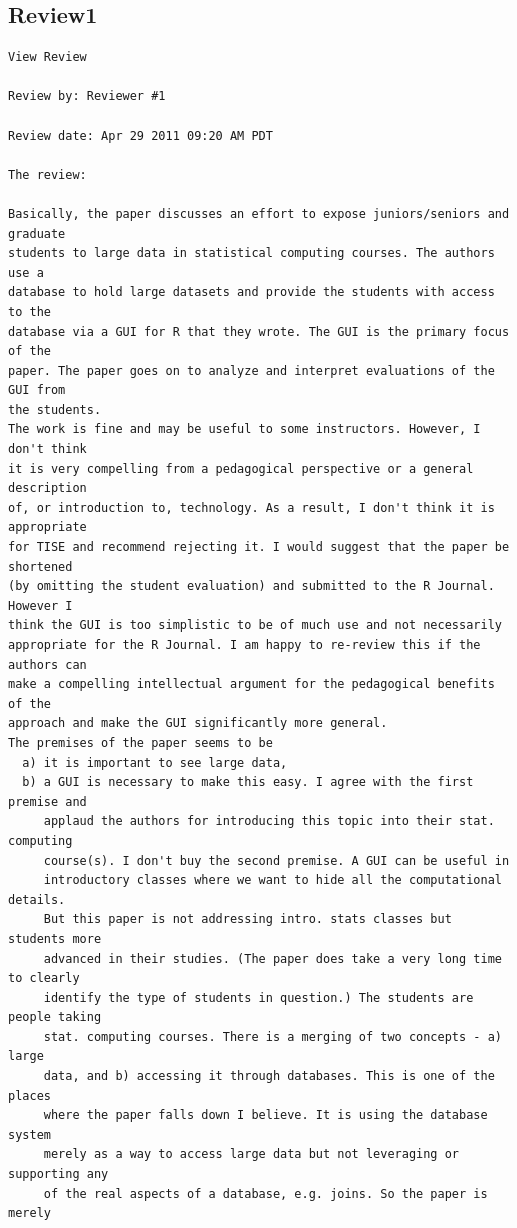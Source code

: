\documentclass[11pt]{tise_style}
\begin{document}
\subsection{Review1}

\begin{verbatim}
View Review

Review by: Reviewer #1

Review date: Apr 29 2011 09:20 AM PDT

The review:

Basically, the paper discusses an effort to expose juniors/seniors and graduate
students to large data in statistical computing courses. The authors use a
database to hold large datasets and provide the students with access to the
database via a GUI for R that they wrote. The GUI is the primary focus of the
paper. The paper goes on to analyze and interpret evaluations of the GUI from
the students.
The work is fine and may be useful to some instructors. However, I don't think
it is very compelling from a pedagogical perspective or a general description
of, or introduction to, technology. As a result, I don't think it is appropriate
for TISE and recommend rejecting it. I would suggest that the paper be shortened
(by omitting the student evaluation) and submitted to the R Journal. However I
think the GUI is too simplistic to be of much use and not necessarily
appropriate for the R Journal. I am happy to re-review this if the authors can
make a compelling intellectual argument for the pedagogical benefits of the
approach and make the GUI significantly more general.
The premises of the paper seems to be
  a) it is important to see large data,
  b) a GUI is necessary to make this easy. I agree with the first premise and
     applaud the authors for introducing this topic into their stat. computing
     course(s). I don't buy the second premise. A GUI can be useful in
     introductory classes where we want to hide all the computational details.
     But this paper is not addressing intro. stats classes but students more
     advanced in their studies. (The paper does take a very long time to clearly
     identify the type of students in question.) The students are people taking
     stat. computing courses. There is a merging of two concepts - a) large
     data, and b) accessing it through databases. This is one of the places
     where the paper falls down I believe. It is using the database system
     merely as a way to access large data but not leveraging or supporting any
     of the real aspects of a database, e.g. joins. So the paper is merely

\end{verbatim}
\end{document}
